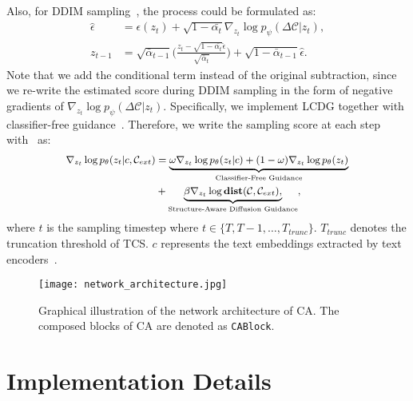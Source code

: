 \documentclass{article}
\begin{document}
Also, for DDIM sampling~\cite{ho2020denoising}, the process could be formulated as:
\begin{equation}
  \begin{aligned}
    \hat{\epsilon} &= \epsilon ( z_t ) + \sqrt{1 - \bar{\alpha_t}} \nabla_{z_t} \log p_\psi ( \Delta \mathcal{C} | z_t ),\\
    z_{t-1} &= \sqrt{\bar{\alpha}_{t-1}} \Big( \frac{z_t - \sqrt{1 - \bar{\alpha_t}} \hat{\epsilon}}{\sqrt{\bar{\alpha}_t}} \Big) + \sqrt{1 - \bar{\alpha}_{t-1}} \hat{\epsilon}.
  \end{aligned}
\end{equation}
Note that we add the conditional term instead of the original subtraction, since we re-write the estimated score during DDIM sampling in the form of negative gradients of $\nabla_{z_t} \log p_\psi ( \Delta \mathcal{C} | z_t )$. Specifically, we implement LCDG together with classifier-free guidance~\cite{ho2022classifier}. Therefore, we write the sampling score at each step with~\cite{ho2022classifier} as:
\begin{equation}
  \centering
  \small
  \begin{aligned}
  \nabla_{z_t} \log p_\theta(z_t | c, \mathcal{C}_{ext}) &= \underbrace{\omega \nabla_{z_t} \log p_\theta (z_t | c) + ( 1 - \omega ) \nabla_{z_t} \log p_\theta (z_t)}_{\text{Classifier-Free Guidance}}\\ 
  &+ \underbrace{\beta \nabla_{z_t} \log \mathbf{dist}(\mathcal{C}, \mathcal{C}_{ext}),}_{\text{Structure-Aware Diffusion Guidance}},
  \end{aligned}
\end{equation}
where $t$ is the sampling timestep where $t \in \{ T, T-1, \dots, T_{trunc} \}$. $T_{trunc}$ denotes the truncation threshold of TCS. $c$ represents the text embeddings extracted by text encoders~\cite{radford2021learning,cherti2022reproducible}.











\begin{figure*}[t!]
  \centering
  \texttt{[image: network\_architecture.jpg]} \caption{Graphical illustration of the network architecture of CA. The composed blocks of CA are denoted as \texttt{CABlock}.}
  \label{figure:network architecture}
  \end{figure*}

\section{Implementation Details}
\label{section:implementation details}
\end{document}
